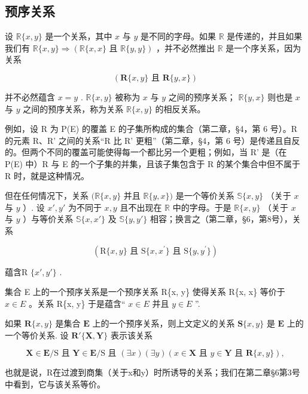 \subsection{预序关系}

设 \(\mathbb{R}\{x, y\}\) 是一个关系，其中 \(x\) 与 \(y\) 是不同的字母。如果 \(\mathbb{R}\) 是传递的，并且如果我们有 \(\mathbb{R}\{x, y\} \Longrightarrow (\mathbb{R}\{x, x\} \text{ 且 } \mathbb{R}\{y, y\})\) ，并不必然推出 \(\mathbb{R}\) 是一个序关系，因为关系

\[
(\mathbf {R} \{x, y \} \text { 且 } \mathbf {R} \{y, x \})
\]

并不必然蕴含 \(x = y\) . \(\mathbb{R}\{x, y\}\) 被称为 \(x\) 与 \(y\) 之间的预序关系； \(\mathbb{R}\{y, x\}\) 则也是 \(x\) 与 \(y\) 之间的预序关系，称为关系 \(\mathbb{R}\{x, y\}\) 的相反关系。

例如，设 R 为 P(E) 的覆盖 E 的子集所构成的集合（第二章，§4，第 6 号）。R 的元素 R、R' 之间的关系“R 比 R' 更粗”（第二章，§4，第 6 号）是传递且自反的。但两个不同的覆盖可能使得每一个都比另一个更粗；例如，当 R' 是（在 P(E) 中）R 与 E 的一个子集的并集，且该子集包含于 R 的某个集合中但不属于 R 时，就是这种情况。

但在任何情况下，关系 \((\mathbb{R}\{x, y\}\) 并且 \(\mathbb{R}\{y, x\})\) 是一个等价关系 \(\mathbb{S}\{x, y\}\) （关于 \(x\) 与 \(y\) ）. 设 \(x', y'\) 为不同于 \(x, y\) 且不出现在 \(\mathbb{R}\) 中的字母。于是 \(\mathbb{R}\{x, y\}\) （关于 \(x\) 与 \(y\) ）与等价关系 \(\mathbb{S}\{x, x'\}\) 及 \(\mathbb{S}\{y, y'\}\) 相容；换言之（第二章，§6，第8号），关系

\[
(\mathrm{R} \{x, y \} \text {   且   } \mathrm{S} \{x, x ^ {\prime} \} \text {   且   } \mathrm{S} \{y, y ^ {\prime} \})
\]

蕴含R \(\{x', y'\}\) .

集合 E 上的一个预序关系是一个预序关系 R\{x, y\} 使得关系 R\{x, x\} 等价于 \(x \in E\) 。关系 R\{x, y\} 于是蕴含“ \(x \in E\) 并且 \(y \in E\) ''.

如果 \(\mathbf{R}\{x, y\}\) 是集合 \(\mathbf{E}\) 上的一个预序关系，则上文定义的关系 \(\mathbf{S}\{x, y\}\) 是 \(\mathbf{E}\) 上的一个等价关系. 设 \(\mathbf{R}'\{\mathbf{X}, \mathbf{Y}\}\) 表示该关系

\[
\mathbf {X} \in \mathbf {E} / \mathrm{S} \text { 且 } \mathbf {Y} \in \mathbf {E} / \mathrm{S} \text { 且 } (\exists x) (\exists y) (x \in \mathbf {X} \text { 且 } y \in \mathbf {Y} \text { 且 } \mathbf {R} \{x, y \}),
\]

也就是说，R在过渡到商集（关于x和y）时所诱导的关系；我们在第二章§6第3号中看到，它与该关系等价。

